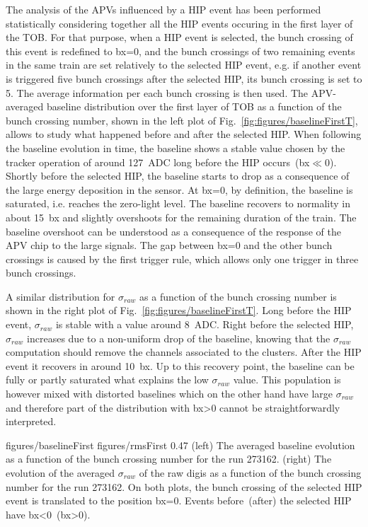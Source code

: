 The analysis of the APVs influenced by a HIP event has been performed statistically considering together all the HIP events occuring in the first layer of the TOB. For that purpose, when a HIP event is selected, the bunch crossing of this event is redefined to bx=0, and the bunch crossings of two remaining events in the same train are set relatively to the selected HIP event, e.g. if another event is triggered five bunch crossings after the selected HIP, its bunch crossing is set to 5. The average information per each bunch crossing is then used. The APV-averaged baseline distribution over the first layer of TOB as a function of the bunch crossing number, shown in the left plot of Fig.~\ref{fig:figures/baselineFirstT}, allows to study what happened before and after the selected HIP. When following the baseline evolution in time, the baseline shows a stable value chosen by the tracker operation of around 127~ADC long before the HIP occurs~(bx$\ll$0). Shortly before the selected HIP, the baseline starts to drop as a consequence of the large energy deposition in the sensor. At bx=0, by definition, the baseline is saturated, i.e. reaches the zero-light level. The baseline recovers to normality in about 15~bx and slightly overshoots for the remaining duration of the train. The baseline overshoot can be understood as a consequence of the response of the APV chip to the large signals. The gap between bx=0 and the other bunch crossings is caused by the first trigger rule, which allows only one trigger in three bunch crossings. 

A similar distribution for $\sigma_{raw}$  as a function of the bunch crossing number is shown in the right plot of Fig.~\ref{fig:figures/baselineFirstT}. Long before the HIP event, $\sigma_{raw}$ is stable with a value around 8~ADC. Right before the selected HIP, $\sigma_{raw}$ increases due to a non-uniform drop of the baseline, knowing that the $\sigma_{raw}$ computation should remove the channels associated to the clusters. After the HIP event it recovers in around 10~bx. Up to this recovery point, the baseline can be fully or partly saturated what explains the low $\sigma_{raw}$ value. This population is however mixed with distorted baselines which on the other hand have large $\sigma_{raw}$ and therefore part of the distribution with bx>0 cannot be straightforwardly interpreted.

                 {figures/baselineFirst} %
                 {figures/rmsFirst} %
                 {0.47}       %
                 {(left) The averaged baseline evolution as a function of the bunch crossing number for the run 273162.  (right) The evolution of the averaged $\sigma_{raw}$ of the raw digis as a function of the bunch crossing number for the  run 273162. On both plots, the bunch crossing of the selected HIP event is translated to the position bx=0. Events before~(after) the selected HIP have bx<0~(bx>0). } %

